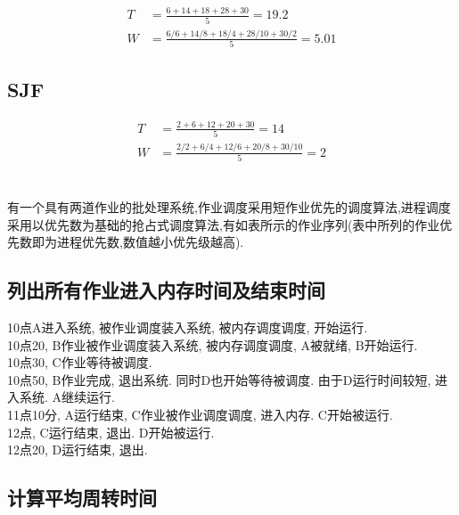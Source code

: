 \documentclass[a4paper, 12pt, notitlepage]{article}
\begin{document}
\begin{align*}
	T &= \frac{6 + 14 + 18 + 28 + 30}{5} = 19.2 \\
	W &= \frac{6/6 + 14/8 + 18/4 + 28/10 + 30/2}{5} = 5.01
\end{align*}

\subsection{SJF}

\begin{align*}
	T &= \frac{2 + 6 + 12 + 20 + 30}{5} = 14 \\
	W &= \frac{2/2 + 6/4 + 12/6 + 20/8 + 30/10}{5} = 2
\end{align*}

\section{ }

	有一个具有两道作业的批处理系统,作业调度采用短作业优先的调度算法,进程调度采用以优先数为基础的抢占式调度算法,有如表所示的作业序列(表中所列的作业优先数即为进程优先数,数值越小优先级越高). \\
	
\subsection{列出所有作业进入内存时间及结束时间}

	10点A进入系统, 被作业调度装入系统, 被内存调度调度, 开始运行. \\
	
	10点20, B作业被作业调度装入系统, 被内存调度调度, A被就绪, B开始运行. \\
	
	10点30, C作业等待被调度. \\
	
	10点50, B作业完成, 退出系统. 同时D也开始等待被调度. 由于D运行时间较短, 进入系统. A继续运行. \\
	
	11点10分, A运行结束, C作业被作业调度调度, 进入内存. C开始被运行. \\
	
	12点, C运行结束, 退出. D开始被运行. \\
	
	12点20, D运行结束, 退出.

\subsection{计算平均周转时间}
\end{document}
